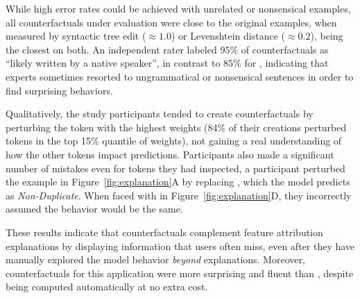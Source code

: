 While high error rates could be achieved with unrelated or nonsensical examples, all counterfactuals under evaluation were close to the original examples, when measured by syntactic tree edit (${\approx}1.0$) or Levenshtein distance (${\approx}0.2$), \cshap being the closest on both. An independent rater labeled $95\%$ of \cshap counterfactuals as ``likely written by a native speaker'', in contrast to $85\%$ for \chuman, indicating that experts sometimes resorted to ungrammatical or nonsensical sentences in order to find surprising behaviors.

Qualitatively, the study participants tended to create counterfactuals by perturbing the token with the highest weights (84\% of their creations perturbed tokens in the top 15\% quantile of weights), not gaining a real understanding of how the other tokens impact predictions. Participants also made a significant number of mistakes even for tokens they had inspected, \eg a participant perturbed the example in Figure~\ref{fig:explanation}A by replacing , which the model predicts as \emph{Non-Duplicate}. When faced with  in Figure~\ref{fig:explanation}D, they incorrectly assumed the behavior would be the same.

These results indicate that \sysname{} counterfactuals complement feature attribution explanations by displaying information that users often miss, even after they have manually explored the model behavior \emph{beyond} explanations. Moreover, \sysname{} counterfactuals for this application were more surprising and fluent than \chuman, despite being computed automatically at no extra cost.



